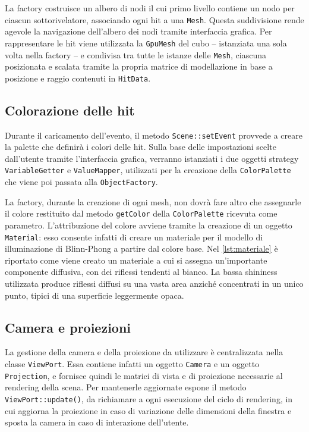 La factory costruisce un albero di nodi il cui primo livello contiene un nodo per ciascun sottorivelatore, associando ogni hit a una \texttt{Mesh}.
Questa suddivisione rende agevole la navigazione dell'albero dei nodi tramite interfaccia grafica.
Per rappresentare le hit viene utilizzata la \texttt{GpuMesh} del cubo -- istanziata una sola volta nella factory -- e condivisa tra tutte le istanze delle \texttt{Mesh}, ciascuna posizionata e scalata tramite la propria matrice di modellazione in base a posizione e raggio contenuti in \texttt{HitData}.

\subsection{Colorazione delle hit}
Durante il caricamento dell'evento, il metodo \texttt{Scene::setEvent} provvede a creare la palette che definirà i colori delle hit.
Sulla base delle impostazioni scelte dall'utente tramite l'interfaccia grafica, verranno istanziati i due oggetti strategy \texttt{VariableGetter} e \texttt{ValueMapper}, utilizzati per la creazione della \texttt{ColorPalette} che viene poi passata alla \texttt{ObjectFactory}.

La factory, durante la creazione di ogni mesh, non dovrà fare altro che assegnarle il colore restituito dal metodo \texttt{getColor} della \texttt{Color\allowbreak{}Palette} ricevuta come parametro.
L'attribuzione del colore avviene tramite la creazione di un oggetto \texttt{Material}: esso consente infatti di creare un materiale per il modello di illuminazione di Blinn-Phong a partire dal colore base.
Nel \cref{lst:materiale} è riportato come viene creato un materiale a cui si assegna un'importante componente diffusiva, con dei riflessi tendenti al bianco.
La bassa shininess utilizzata produce riflessi diffusi su una vasta area anziché concentrati in un unico punto, tipici di una superficie leggermente opaca.



\subsection{Camera e proiezioni}
La gestione della camera e della proiezione da utilizzare è cen\-tralizza\-ta nella classe \texttt{ViewPort}.
Essa contiene infatti un oggetto \texttt{Camera} e un oggetto \texttt{Projection}, e fornisce quindi le matrici di vista e di proiezione necessarie al rendering della scena.
Per mantenerle aggiornate espone il metodo \texttt{ViewPort::update()}, da richiamare a ogni esecuzione del ciclo di rendering, in cui aggiorna la proiezione in caso di variazione delle dimensioni della finestra e sposta la camera in caso di interazione dell'utente.

